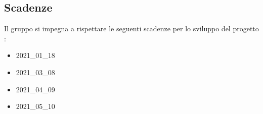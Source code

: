 \subsection{Scadenze}
\label{sub:scadenze_fissate}
Il gruppo {\Gruppo} si impegna a rispettare le seguenti scadenze per lo sviluppo del progetto \NomeProgetto{}:
\begin{itemize}
    \item {} 2021\_01\_18
    \item {} 2021\_03\_08
    \item {} 2021\_04\_09
    \item {} 2021\_05\_10
\end{itemize}
